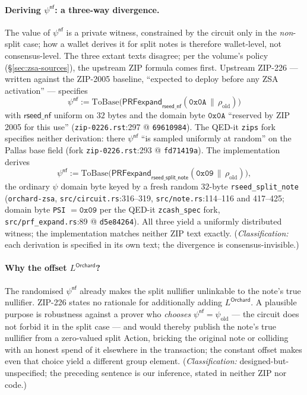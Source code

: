 \documentclass[11pt,a4paper]{article}
\theoremstyle{definition}
\newcommand{\nfsym}{\mathsf{nf}}
\begin{document}
\paragraph{Deriving $\psi^{\nfsym}$: a three-way divergence.} The value
of $\psi^{\nfsym}$ is a private witness, constrained by the circuit only
in the \emph{non}-split case; how a wallet derives it for split notes is
therefore wallet-level, not consensus-level. The three extant texts
disagree; per the volume's policy (\S\ref{sec:zsa-sources}), the upstream
ZIP formula comes first. Upstream ZIP-226 --- written against the
ZIP-2005 baseline, ``expected to deploy before any ZSA activation'' ---
specifies
\[
\psi^{\nfsym} :=
\mathrm{ToBase}\bigl(\mathsf{PRFexpand}_{\mathsf{rseed\_nf}}
(\mathtt{0x0A} \,\|\, \rho_{\mathrm{old}})\bigr)
\]
with $\mathsf{rseed\_nf}$ uniform on $32$ bytes and the domain byte
$\mathtt{0x0A}$ ``reserved by ZIP 2005 for this use''
(\texttt{zip-0226.rst}:297 @ \texttt{69610984}). The QED-it \texttt{zips}
fork specifies neither derivation: there $\psi^{\nfsym}$ ``is sampled
uniformly at random'' on the Pallas base field (fork
\texttt{zip-0226.rst}:293 @ \texttt{fd71419a}). The implementation
derives
\[
\psi^{\nfsym} :=
\mathrm{ToBase}\bigl(\mathsf{PRFexpand}_{\mathsf{rseed\_split\_note}}
(\mathtt{0x09} \,\|\, \rho_{\mathrm{old}})\bigr),
\]
the ordinary $\psi$ domain byte keyed by a fresh random $32$-byte
\texttt{rseed\_split\_note} (\texttt{orchard-zsa},
\texttt{src/circuit.rs}:316--319, \texttt{src/note.rs}:114--116 and
417--425; domain byte \texttt{PSI} $= \mathtt{0x09}$ per the QED-it
\texttt{zcash\_spec} fork, \texttt{src/prf\_expand.rs}:89 @
\texttt{d5e84264}). All three yield a uniformly distributed witness; the
implementation matches neither ZIP text exactly. (\emph{Classification:}
each derivation is specified in its own text; the divergence is
consensus-invisible.)

\paragraph{Why the offset $L^{\mathsf{Orchard}}$?} The randomised
$\psi^{\nfsym}$ already makes the split nullifier unlinkable to the
note's true nullifier. ZIP-226 states no rationale for additionally
adding $L^{\mathsf{Orchard}}$. A plausible purpose is robustness against
a prover who \emph{chooses} $\psi^{\nfsym} = \psi_{\mathrm{old}}$ --- the
circuit does not forbid it in the split case --- and would thereby
publish the note's true nullifier from a zero-valued split Action,
bricking the original note or colliding with an honest spend of it
elsewhere in the transaction; the constant offset makes even that choice
yield a different group element. (\emph{Classification:}
designed-but-unspecified; the preceding sentence is our inference, stated
in neither ZIP nor code.)
\end{document}
